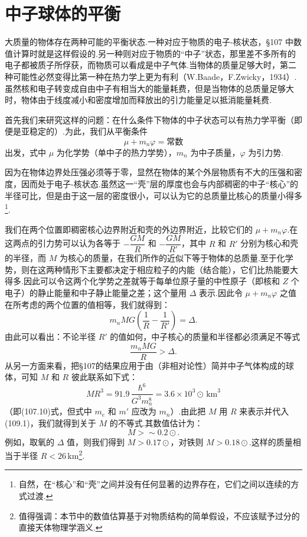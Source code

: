 \section{中子球体的平衡}

大质量的物体存在两种可能的平衡状态.一种对应于物质的电子-核状态，§107 中数值计算时就是这样假设的.另一种则对应于物质的“中子”状态，那里差不多所有的电子都被质子所俘获，而物质可以看成是中子气体.当物体的质量足够大时，第二种可能性必然变得比第一种在热力学上更为有利（W.Baade，F.Zwicky，1934）.虽然核和电子转变成自由中子有相当大的能量耗费，但是当物体的总质量足够大时，物体由于线度减小和密度增加而释放出的引力能量足以抵消能量耗费.

首先我们来研究这样的问题：在什么条件下物体的中子状态可以有热力学平衡（即便是亚稳定的）.为此，我们从平衡条件
\begin{equation*}
  \mu+m_n\varphi=\text{常数}
\end{equation*}
出发，式中 $\mu$ 为化学势（单中子的热力学势），$m_n$ 为中子质量，$\varphi$ 为引力势.

因为在物体边界处压强必须等于零，显然在物体的某个外层物质有不大的压强和密度，因而处于电子-核状态.虽然这一“壳”层的厚度也会与内部稠密的中子“核心”的半径可比，但是由于这一层的密度很小，可以认为它的总质量比核心的质量小得多\footnote{自然，在“核心”和“壳”之间并没有任何显著的边界存在，它们之间以连续的方式过渡.}.

我们在两个位置即稠密核心边界附近和壳的外边界附近，比较它们的 $\mu+m_n\varphi$.在这两点的引力势可以认为各等于 $-\dfrac{GM}{R}$ 和 $-\dfrac{GM}{R'}$，其中 $R$ 和 $R'$ 分别为核心和壳的半径，而 $M$ 为核心的质量，在我们所作的近似下等于物体的总质量.至于化学势，则在这两种情形下主要都决定于相应粒子的内能（结合能），它们比热能要大得多.因此可以令这两个化学势之差就等于每单位原子量的中性原子（即核和 $Z$ 个电子）的静止能量和中子静止能量之差；这个量用 $\Delta$ 表示.因此令 $\mu+m_n\varphi$ 之值在所考虑的两个位置的值相等，我们就得到：
\begin{equation*}
  m_nMG\left(\frac1R-\frac{1}{R'}\right)=\Delta.
\end{equation*}
由此可以看出：不论半径 $R'$ 的值如何，中子核心的质量和半径都必须满足不等式
\begin{equation}
  \frac{m_nMG}{R}>\Delta.
\end{equation}
从另一方面来看，把§107的结果应用于由（非相对论性）简并中子气体构成的球体，可知 $M$ 和 $R$ 彼此联系如下式：
\begin{equation}
  MR^3=91.9\,\frac{\hbar^6}{G^3m_n^8}
  =3.6\times10^3\odot\,\mathrm{km}^3
\end{equation}
（即(107.10)式，但式中 $m_e$ 和 $m'$ 应改为 $m_n$）.由此把 $M$ 用 $R$ 来表示并代入(109.1)，我们就得到关于 $M$ 的不等式.其数值估计为：
\begin{equation*}
  M>\sim0.2\odot.
\end{equation*}
例如，取氧的 $\Delta$ 值，则我们得到 $M>0.17\odot$，对铁则 $M>0.18\odot$.这样的质量相当于半径 $R<26\,\mathrm{km}$\footnote{值得强调：本节中的数值估算基于对物质结构的简单假设，不应该赋予过分的直接天体物理学涵义.}.

